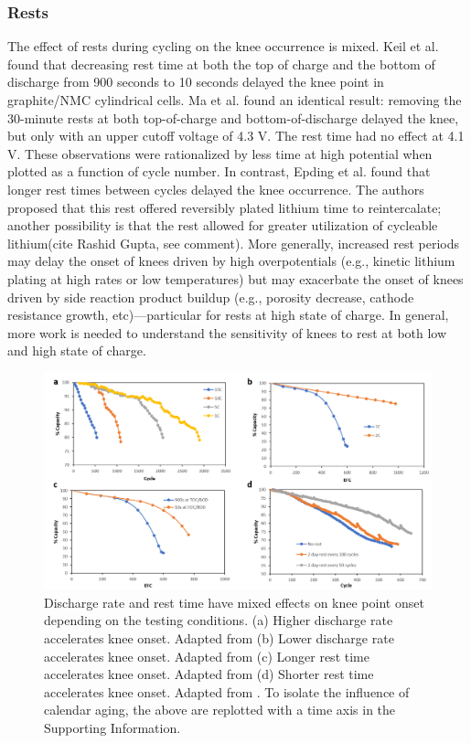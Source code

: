 \documentclass[journal=jpcl, manuscript=article, layout=onecolumn]{achemso}
\begin{document}
\subsubsection{Rests}

The effect of rests during cycling on the knee occurrence is mixed. 
Keil et al.\cite{keil_linear_2019} found that decreasing rest time at both the top of charge and the bottom of discharge from 900 seconds to 10 seconds delayed the knee point in graphite/NMC cylindrical cells.
Ma et al.\cite{ma_editors_2019} found an identical result: removing the 30-minute rests at both top-of-charge and bottom-of-discharge delayed the knee, but only with an upper cutoff voltage of 4.3 V. The rest time had no effect at 4.1 V.
These observations were rationalized by less time at high potential when plotted as a function of cycle number.
In contrast, Epding et al.\cite{epding_investigation_2019} found that longer rest times between cycles delayed the knee occurrence. The authors proposed that this rest offered reversibly plated lithium time to reintercalate; another possibility is that the rest allowed for greater utilization of cycleable lithium(cite Rashid Gupta, see comment). More generally, increased rest periods may delay the onset of knees driven by high overpotentials (e.g., kinetic lithium plating at high rates or low temperatures) but may exacerbate the onset of knees driven by side reaction product buildup (e.g., porosity decrease, cathode resistance growth, etc)---particular for rests at high state of charge. In general, more work is needed to understand the sensitivity of knees to rest at both low and high state of charge.


\begin{figure}[ht]
\centering
\includegraphics[scale = 1.0]{figures/Discharge-rest_cycle.png}
\caption{Discharge rate and rest time have mixed effects on knee point onset depending on the testing conditions. (a) Higher discharge rate accelerates knee onset. Adapted from \cite{omar_lithium_2014} (b) Lower discharge rate accelerates knee onset. Adapted from \cite{keil_linear_2019} (c) Longer rest time accelerates knee onset. Adapted from \cite{keil_linear_2019} (d) Shorter rest time accelerates knee onset. Adapted from \cite{epding_investigation_2019}. To isolate the influence of calendar aging, the above are replotted with a time axis in the Supporting Information.  }
\label{fig:discharge-rest_cycle}
\end{figure}
\end{document}
